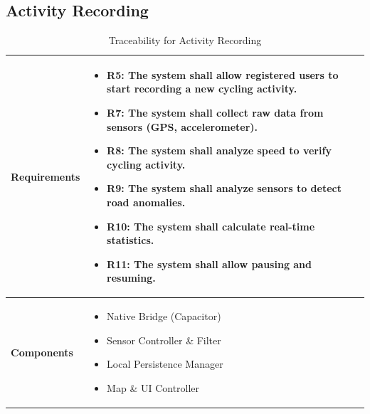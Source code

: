 \subsection{Activity Recording}
\begin{table}[H]
    \centering
    \renewcommand{\arraystretch}{1.5}
    \begin{tabular}{|p{}|p{}|}
        \hline
        \textbf{Requirements} & 
        \begin{itemize}[nosep, leftmargin=*, label={}, before=\vspace{-0.6\baselineskip}, after=\strut]
            \item \textbf{R5:} The system shall allow registered users to start recording a new cycling activity.
            \item \textbf{R7:} The system shall collect raw data from sensors (GPS, accelerometer).
            \item \textbf{R8:} The system shall analyze speed to verify cycling activity.
            \item \textbf{R9:} The system shall analyze sensors to detect road anomalies.
            \item \textbf{R10:} The system shall calculate real-time statistics.
            \item \textbf{R11:} The system shall allow pausing and resuming.
        \end{itemize} \\
        \hline
        \textbf{Components} & 
        \begin{itemize}[nosep, leftmargin=*, before=\vspace{-0.6\baselineskip}, after=\strut]
            \item Native Bridge (Capacitor)
            \item Sensor Controller \& Filter
            \item Local Persistence Manager
            \item Map \& UI Controller
        \end{itemize} \\
        \hline
    \end{tabular}
    \caption{Traceability for Activity Recording}
\end{table}

